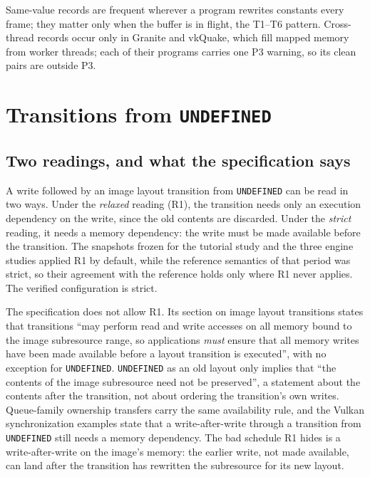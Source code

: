 \documentclass[acmtog,anonymous,review]{acmart}
\newcommand{\code}[1]{\texttt{#1}}
\begin{document}
Same-value records are frequent wherever a program rewrites constants every frame; they matter only when the buffer is
in flight, the T1--T6 pattern. Cross-thread records occur only in Granite and vkQuake, which fill mapped memory from
worker threads; each of their programs carries one P3 warning, so its clean pairs are outside P3.

\section{Transitions from \texttt{UNDEFINED}}
\label{sup:undefined}

\subsection{Two readings, and what the specification says}
A write followed by an image layout transition from \code{UNDEFINED} can be read in two ways. Under the
\emph{relaxed} reading (R1), the transition needs only an execution dependency on the write, since the old contents are
discarded. Under the \emph{strict} reading, it needs a memory dependency: the write must be made available before the
transition. The snapshots frozen for the tutorial study and the three engine studies applied R1 by default, while the
reference semantics of that period was strict, so their agreement with the reference holds only where R1 never
applies. The verified configuration is strict.

The specification does not allow R1. Its section on image layout transitions states that transitions ``may perform
read and write accesses on all memory bound to the image subresource range, so applications \emph{must} ensure that all
memory writes have been made available before a layout transition is executed'', with no exception for
\code{UNDEFINED}. \code{UNDEFINED} as an old layout only implies that ``the contents of the image subresource need not be
preserved'', a statement about the contents after the transition, not about ordering the transition's own writes.
Queue-family ownership transfers carry the same availability rule, and the Vulkan synchronization examples state that
a write-after-write through a transition from \code{UNDEFINED} still needs a memory dependency. The bad schedule R1
hides is a write-after-write on the image's memory: the earlier write, not made available, can land after the
transition has rewritten the subresource for its new layout.
\end{document}
